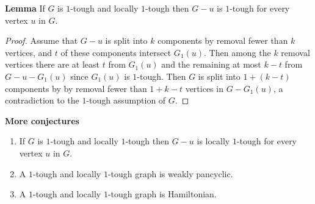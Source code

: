\documentclass{beamer}
\theoremstyle{plain}
\theoremstyle{definition}
\begin{document}
\begin{frame}{\bf Lemma}
If $G$ is $1$-tough and locally $1$-tough then $G-u$ is $1$-tough for every vertex $u$ in $G$. 

\begin{proof} 
Assume that $G-u$ is split into $k$ components by removal fewer than $k$ vertices, and $t$ of these components intersect $G_1(u)$. 
Then among the $k$ removal vertices there are at least $t$ from $G_1(u)$ and the remaining at most $k-t$ from $G-u-G_1(u)$ since $G_1(u)$ is $1$-tough.
Then $G$ is split into $1+(k-t)$ components by  by removal fewer than $1+k-t$ vertices in $G-G_1(u)$, a contradiction to the $1$-tough assumption of $G$. 
\end{proof}
\end{frame}


\begin{frame}{\bf More conjectures}
\begin{enumerate}
\item If $G$ is $1$-tough and locally $1$-tough then $G-u$ is locally $1$-tough for every vertex $u$ in $G$. 
\item  A $1$-tough and locally $1$-tough graph is weakly pancyclic. 
\item  A $1$-tough and locally $1$-tough graph is Hamiltonian. 
\end{enumerate}

\end{frame}
\end{document}
